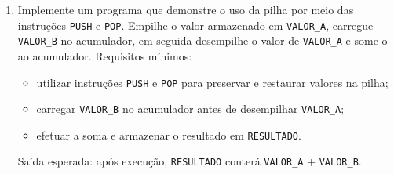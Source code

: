 \documentclass[12pt,a4paper]{article}
\begin{document}
\begin{enumerate}[left=0pt,label=\textbf{Exercício \arabic*:},itemsep=8pt]
\item Implemente um programa que demonstre o uso da pilha por meio das instruções \texttt{PUSH} e \texttt{POP}.
Empilhe o valor armazenado em \texttt{VALOR\_A}, carregue \texttt{VALOR\_B} no acumulador, em seguida desempilhe o valor de \texttt{VALOR\_A} e some-o ao acumulador.
Requisitos mínimos:
\begin{itemize}
	\item utilizar instruções \texttt{PUSH} e \texttt{POP} para preservar e restaurar valores na pilha;
	\item carregar \texttt{VALOR\_B} no acumulador antes de desempilhar \texttt{VALOR\_A};
	\item efetuar a soma e armazenar o resultado em \texttt{RESULTADO}.
\end{itemize}
Saída esperada: após execução, \texttt{RESULTADO} conterá \texttt{VALOR\_A} + \texttt{VALOR\_B}.

\end{enumerate}
\end{document}
